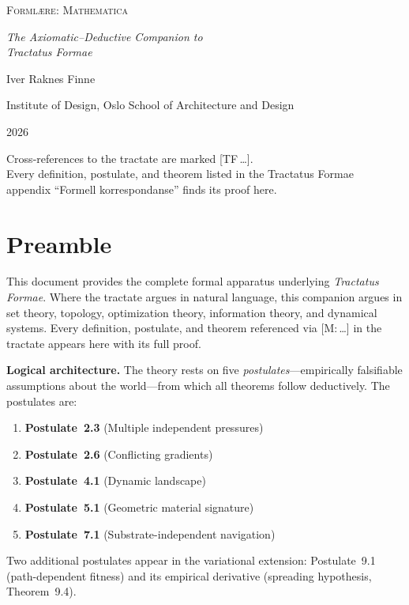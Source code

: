 \documentclass[11pt, a4paper]{article}
\theoremstyle{definition}
\theoremstyle{plain}
\theoremstyle{remark}
\newcommand{\TF}[1]{\textnormal{[TF\,#1]}}  %
\begin{document}
\begin{titlepage}
\centering
\vspace*{4cm}
{\Large\scshape Forml\ae re: Mathematica}

\vspace{1cm}
{\large\itshape The Axiomatic--Deductive Companion to\\[4pt]
Tractatus Formae}

\vspace{2cm}
{\normalsize Iver Raknes Finne}

\vspace{0.5cm}
{\small Institute of Design, Oslo School of Architecture and Design}

\vspace{4cm}
{\small 2026}

\vfill
{\footnotesize
Cross-references to the tractate are marked \TF{\ldots}.\\
Every definition, postulate, and theorem listed in the Tractatus Formae\\
appendix ``Formell korrespondanse'' finds its proof here.}
\end{titlepage}

\tableofcontents
\newpage

\section*{Preamble}

This document provides the complete formal apparatus underlying
\textit{Tractatus Formae}. Where the tractate argues in natural language,
this companion argues in set theory, topology, optimization theory,
information theory, and dynamical systems. Every definition, postulate,
and theorem referenced via \textup{[M:\,\ldots]} in the tractate appears
here with its full proof.

\medskip\noindent\textbf{Logical architecture.}
The theory rests on five \emph{postulates}---empirically falsifiable
assumptions about the world---from which all theorems follow deductively.
The postulates are:
\begin{enumerate}[nosep]
  \item \textbf{Postulate~2.3}\; (Multiple independent pressures)
  \item \textbf{Postulate~2.6}\; (Conflicting gradients)
  \item \textbf{Postulate~4.1}\; (Dynamic landscape)
  \item \textbf{Postulate~5.1}\; (Geometric material signature)
  \item \textbf{Postulate~7.1}\; (Substrate-independent navigation)
\end{enumerate}
Two additional postulates appear in the variational extension:
Postulate~9.1 (path-dependent fitness) and its empirical derivative
(spreading hypothesis, Theorem~9.4).
\end{document}
